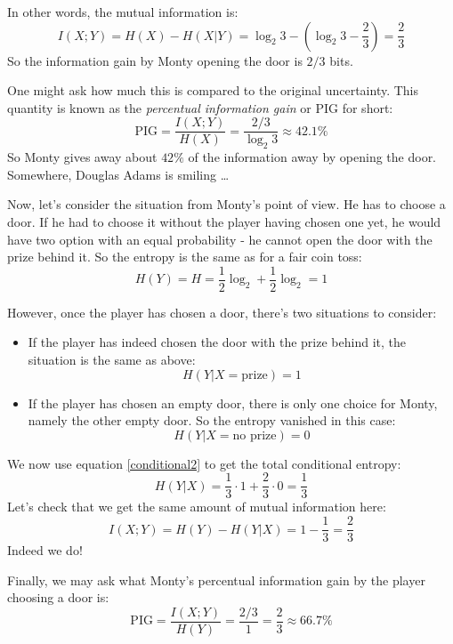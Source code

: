 \documentclass[12pt, a4paper]{article}
\numberwithin{equation}{section}
\begin{document}
In other words, the mutual information is:
\begin{equation}
I(X;Y)=H(X)-H(X|Y)=\log_2 3-\left(\log_2 3-\frac{2}{3}\right)=\frac{2}{3}
\end{equation}
So the information gain by Monty opening the door is $2/3$ bits.

One might ask how much this is compared to the original uncertainty. This quantity is known as the \textit{percentual information gain} or PIG for short:
\begin{equation}
\textrm{PIG}=\frac{I(X;Y)}{H(X)}=\frac{2/3}{\log_2 3}\approx 42.1\%
\end{equation}
So Monty gives away about $42\%$ of the information away by opening the door. Somewhere, Douglas Adams is smiling \ldots

Now, let's consider the situation from Monty's point of view. He has to choose a door. If he had to choose it without the player having chosen one yet, he would have two option with an equal probability - he cannot open the door with the prize behind it. So the entropy is the same as for a fair coin toss:
\begin{equation}
H(Y)=H=\frac{1}{2}\log_2+\frac{1}{2}\log_2=1
\end{equation}

However, once the player has chosen a door, there's two situations to consider:
\begin{itemize}
\item If the player has indeed chosen the door with the prize behind it, the situation is the same as above:
\begin{equation}
H(Y|X=\textrm{prize})=1
\end{equation}
\item If the player has chosen an empty door, there is only one choice for Monty, namely the other empty door. So the entropy vanished in this case:
\begin{equation}
H(Y|X=\textrm{no prize})=0
\end{equation}
\end{itemize}
We now use equation \ref{conditional2} to get the total conditional entropy:
\begin{equation}
H(Y|X)=\frac{1}{3}\cdot 1+\frac{2}{3}\cdot 0=\frac{1}{3}
\end{equation}
Let's check that we get the same amount of mutual information here:
\begin{equation}
I(X;Y)=H(Y)-H(Y|X)=1-\frac{1}{3}=\frac{2}{3}
\end{equation}
Indeed we do!

Finally, we may ask what Monty's percentual information gain by the player choosing a door is:
\begin{equation}
\textrm{PIG}=\frac{I(X;Y)}{H(Y)}=\frac{2/3}{1}=\frac{2}{3}\approx 66.7\%
\end{equation}
\end{document}
